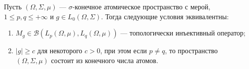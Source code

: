 \begin{proposition}\label{TopInjMultOpCharacOnPureAtomMeasSp} Пусть
$(\Omega,\Sigma,\mu)$ --- $\sigma$-конечное атомическое пространство с мерой,
$1\leq p,q\leq +\infty$ и $g\in L_0(\Omega,\Sigma)$. Тогда следующие условия
эквивалентны:

\begin{enumerate}[label = (\roman*)]
    \item $M_g\in\mathcal{B}(L_p(\Omega,\mu),L_q(\Omega,\mu))$ --- топологически
    инъективный оператор;

    \item $|g|\geq c$ для некоторого $c>0$, при этом если $p\neq q$, 
    то пространство $(\Omega,\Sigma,\mu)$ состоит из конечного числа атомов.
\end{enumerate}
\end{proposition}
